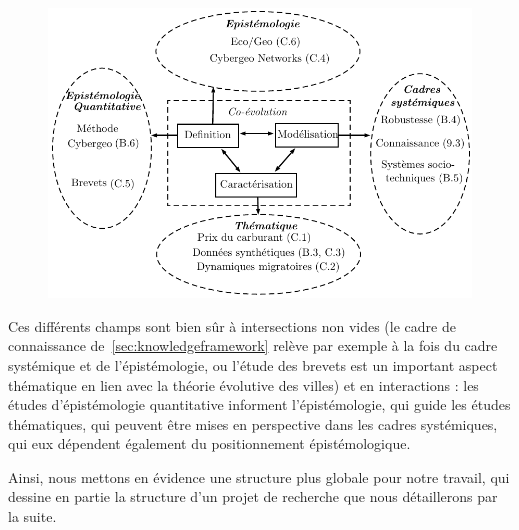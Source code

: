 \begin{figure}
	\begin{mdframed}
	\includegraphics[width=\linewidth]{Figures/Theory/metacadre_norefs.pdf}
	\medskip
	\end{mdframed}
\end{figure}



Ces différents champs sont bien sûr à intersections non vides (le cadre de connaissance de~\ref{sec:knowledgeframework} relève par exemple à la fois du cadre systémique et de l'épistémologie, ou l'étude des brevets est un important aspect thématique en lien avec la théorie évolutive des villes) et en interactions : les études d'épistémologie quantitative informent l'épistémologie, qui guide les études thématiques, qui peuvent être mises en perspective dans les cadres systémiques, qui eux dépendent également du positionnement épistémologique.

Ainsi, nous mettons en évidence une structure plus globale pour notre travail, qui dessine en partie la structure d'un projet de recherche que nous détaillerons par la suite.



